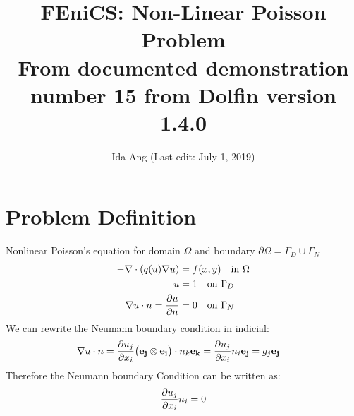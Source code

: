 \documentclass[12pt,3p]{article}
\begin{document}
\title{FEniCS: Non-Linear Poisson Problem \\
	\large{From documented demonstration number 15 from Dolfin version 1.4.0}}
\author{Ida Ang (Last edit: July 1, 2019)}
\date{\vspace{-5ex}}
\maketitle

\section{Problem Definition}
Nonlinear Poisson's equation for domain $\Omega$ and boundary $\partial \Omega = \Gamma_D \cup \Gamma_N$
\begin{align}\label{ProbDef1}
\begin{split}
- \nabla \cdot (q(u) \nabla u ) &= f(x,y) \quad \text{in } \Omega \\
					u &= 1 \quad \text{on } \Gamma_D \\
		\nabla u \cdot n = \pdv{u}{n} &= 0 \quad \text{on } \Gamma_N \\
\end{split}
\end{align}
We can rewrite the Neumann boundary condition in indicial: 
\begin{align*}
\nabla u \cdot n &= \pdv{u_j}{x_i} \big( \mathbf{e_j} \otimes \mathbf{e_i} \big) \cdot n_k \mathbf{e_k} = \pdv{u_j}{x_i} n_i \mathbf{e_j} = g_j \mathbf{e_j}
\end{align*}
Therefore the Neumann boundary Condition can be written as:
\begin{equation}\label{NBoundInd}
\pdv{u_j}{x_i} n_i  = 0 
\end{equation}
\end{document}
